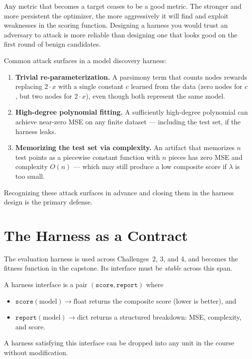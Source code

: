 \begin{principle}
\label{principle:GoodhartsLaw}
Any metric that becomes a target ceases to be a good metric.
The stronger and more persistent the optimizer, the more aggressively it will find and exploit weaknesses in the scoring function.
Designing a harness you would trust an adversary to attack is more reliable than designing one that looks good on the first round of benign candidates.
\end{principle}

Common attack surfaces in a model discovery harness:
\begin{enumerate}
\item \textbf{Trivial re-parameterization.} A parsimony term that counts nodes rewards replacing $2 \cdot x$ with a single constant $c$ learned from the data (zero nodes for $c$, but two nodes for $2 \cdot x$), even though both represent the same model.
\item \textbf{High-degree polynomial fitting.} A sufficiently high-degree polynomial can achieve near-zero MSE on any finite dataset — including the test set, if the harness leaks.
\item \textbf{Memorizing the test set via complexity.} An artifact that memorizes $n$ test points as a piecewise constant function with $n$ pieces has zero MSE and complexity $O(n)$ — which may still produce a low composite score if $\lambda$ is too small.
\end{enumerate}

Recognizing these attack surfaces in advance and closing them in the harness design is the primary defense.

\section{The Harness as a Contract}
\label{section:HarnessContract}

The evaluation harness is used across Challenges~2, 3, and 4, and becomes the fitness function in the capstone.
Its interface must be \emph{stable} across this span.

\begin{definition}
\label{definition:HarnessContract}
A harness interface is a pair $(\texttt{score}, \texttt{report})$ where
\begin{itemize}
\item $\texttt{score}(\text{model}) \to \text{float}$ returns the composite score (lower is better), and
\item $\texttt{report}(\text{model}) \to \text{dict}$ returns a structured breakdown: MSE, complexity, and score.
\end{itemize}
A harness satisfying this interface can be dropped into any unit in the course without modification.
\end{definition}

